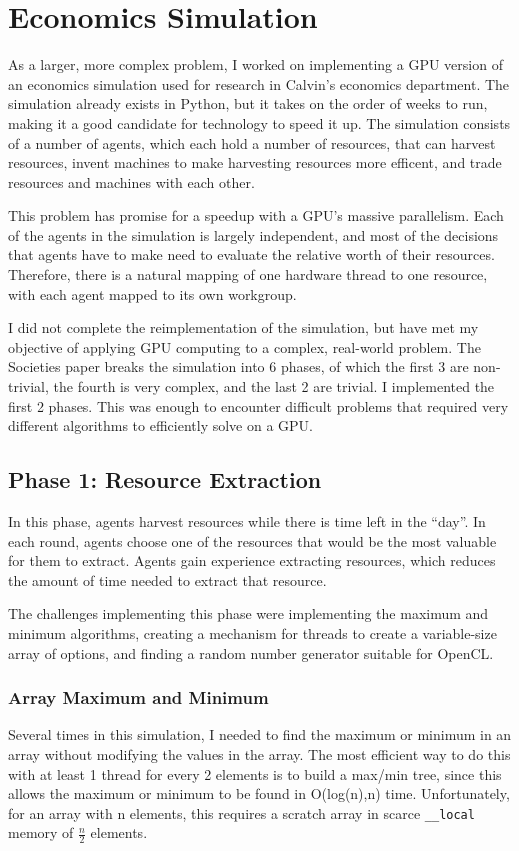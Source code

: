 \documentclass{article}
\begin{document}
\section{Economics Simulation}
As a larger, more complex problem, I worked on implementing a GPU version of an economics simulation used for research in Calvin's economics department.\cite{ditta13} The simulation already exists in Python, but it takes on the order of weeks to run, making it a good candidate for technology to speed it up. The simulation consists of a number of agents, which each hold a number of resources, that can harvest resources, invent machines to make harvesting resources more efficent, and trade resources and machines with each other.

This problem has promise for a speedup with a GPU's massive parallelism. Each of the agents in the simulation is largely independent, and most of the decisions that agents have to make need to evaluate the relative worth of their resources. Therefore, there is a natural mapping of one hardware thread to one resource, with each agent mapped to its own workgroup.

I did not complete the reimplementation of the simulation, but have met my objective of applying GPU computing to a complex, real-world problem. The Societies paper\cite{ditta13} breaks the simulation into 6 phases, of which the first 3 are non-trivial, the fourth is very complex, and the last 2 are trivial. I implemented the first 2 phases. This was enough to encounter difficult problems that required very different algorithms to efficiently solve on a GPU.

\subsection{Phase 1: Resource Extraction}
In this phase, agents harvest resources while there is time left in the ``day''. In each round, agents choose one of the resources that would be the most valuable for them to extract. Agents gain experience extracting resources, which reduces the amount of time needed to extract that resource.

The challenges implementing this phase were implementing the maximum and minimum algorithms, creating a mechanism for threads to create a variable-size array of options, and finding a random number generator suitable for OpenCL.

\subsubsection{Array Maximum and Minimum}
Several times in this simulation, I needed to find the maximum or minimum in an array without modifying the values in the array. The most efficient way to do this with at least 1 thread for every 2 elements is to build a max/min tree, since this allows the maximum or minimum to be found in O(log(n),n) time. Unfortunately, for an array with n elements, this requires a scratch array in scarce \texttt{\_\_local} memory of $\frac{n}{2}$ elements.
\end{document}

